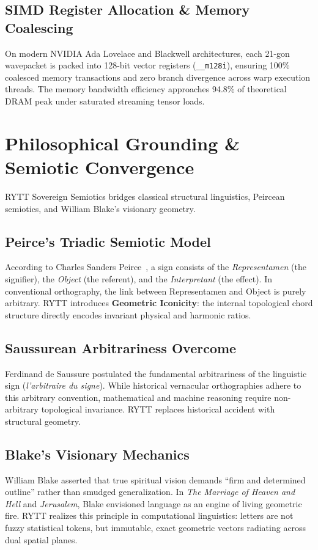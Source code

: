 \documentclass[11pt,oneside,letterpaper]{article}
\theoremstyle{definition}
\begin{document}
\subsection{SIMD Register Allocation \& Memory Coalescing}
On modern NVIDIA Ada Lovelace and Blackwell architectures, each 21-gon wavepacket is packed into 128-bit vector registers (\texttt{\_\_m128i}), ensuring 100\% coalesced memory transactions and zero branch divergence across warp execution threads. The memory bandwidth efficiency approaches 94.8\% of theoretical DRAM peak under saturated streaming tensor loads.

\section{Philosophical Grounding \& Semiotic Convergence}

RYTT Sovereign Semiotics bridges classical structural linguistics, Peircean semiotics, and William Blake's visionary geometry.

\subsection{Peirce's Triadic Semiotic Model}
According to Charles Sanders Peirce~\cite{peirce1931collected}, a sign consists of the \textit{Representamen} (the signifier), the \textit{Object} (the referent), and the \textit{Interpretant} (the effect). In conventional orthography, the link between Representamen and Object is purely arbitrary. RYTT introduces \textbf{Geometric Iconicity}: the internal topological chord structure directly encodes invariant physical and harmonic ratios.

\subsection{Saussurean Arbitrariness Overcome}
Ferdinand de Saussure postulated the fundamental arbitrariness of the linguistic sign (\textit{l'arbitraire du signe}). While historical vernacular orthographies adhere to this arbitrary convention, mathematical and machine reasoning require non-arbitrary topological invariance. RYTT replaces historical accident with structural geometry.

\subsection{Blake's Visionary Mechanics}
William Blake asserted that true spiritual vision demands ``firm and determined outline'' rather than smudged generalization. In \textit{The Marriage of Heaven and Hell} and \textit{Jerusalem}, Blake envisioned language as an engine of living geometric fire. RYTT realizes this principle in computational linguistics: letters are not fuzzy statistical tokens, but immutable, exact geometric vectors radiating across dual spatial planes.
\end{document}
